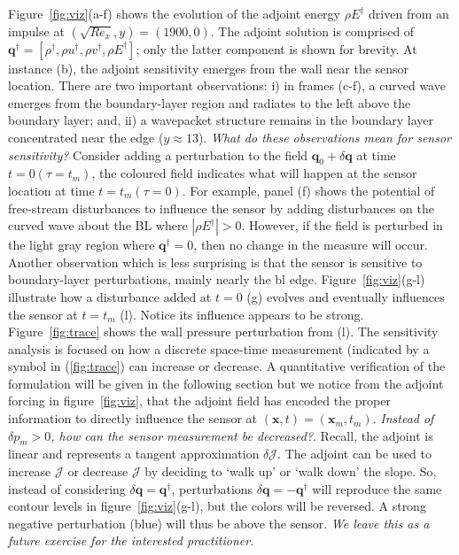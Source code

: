 Figure~\ref{fig:viz}(a-f) shows the evolution of the adjoint energy $\rho E^\dagger$ driven from an impulse at $(\sqrt{Re_x},y)=(1900,0)$. The adjoint solution is comprised of $\mathbf{q}^\dagger=[\rho^\dagger, \rho u^\dagger, \rho v^\dagger, \rho E^\dagger]$; only the latter component is shown for brevity. At instance (b), the adjoint sensitivity emerges from the wall near the sensor location. There are two important observations: i) in frames (c-f), a curved wave emerges from the boundary-layer region and radiates to the left above the boundary layer; and, ii) a wavepacket structure remains in the boundary layer concentrated near the edge ($y\approx 13$). \textit{What do these observations mean for sensor sensitivity?} Consider adding a perturbation to the field $\mathbf{q}_0+\delta \mathbf{q}$ at time $t=0 (\tau=t_m)$, the coloured field indicates what will happen at the sensor location at time $t=t_m (\tau=0)$.  For example, panel (f) shows the potential of free-stream disturbances to influence the sensor by adding disturbances on the curved wave about the BL where $|\rho E^\dagger|>0$. However, if the field is perturbed in the light gray region where $\mathbf{q}^\dagger=0$, then no change in the measure will occur.  Another observation which is less surprising is that the sensor is sensitive to boundary-layer perturbations, mainly nearly the bl edge.  Figure~\ref{fig:viz}(g-l) illustrate how a disturbance added at $t=0$ (g) evolves and eventually influences the sensor at $t=t_m$ (l).  Notice its influence appears to be strong.  Figure~\ref{fig:trace} shows the wall pressure perturbation from (l). The sensitivity analysis is focused on how a discrete space-time measurement (indicated by a symbol in (\ref{fig:trace}) can increase or decrease.  A quantitative verification of the formulation will be given in the following section but we notice from the adjoint forcing in figure~\ref{fig:viz}, that the adjoint field has encoded the proper information to directly influence the sensor at $(\mathbf{x},t)=(\mathbf{x}_m,t_m)$.  \textit{Instead of $\delta p_m > 0$, how can the sensor measurement be decreased?}. Recall, the adjoint is linear and represents a tangent approximation $\delta \mathcal{J}$. The adjoint can be used to increase $\mathcal{J}$ or decrease $\mathcal{J}$ by deciding to `walk up' or `walk down' the slope. So, instead of considering $\delta \mathbf{q}=\mathbf{q}^\dagger$, perturbations  $\delta\mathbf{q}=-\mathbf{q}^\dagger$ will reproduce the same contour levels in figure~\ref{fig:viz}(g-l), but the colors will be reversed. A strong negative perturbation (blue) will thus be above the sensor.  \textit{We leave this as a future exercise for the interested practitioner.}

